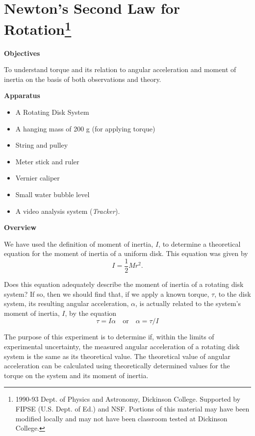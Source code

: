 
\section{Newton's Second Law for Rotation\footnote{
1990-93 Dept. of Physics and Astronomy, Dickinson College. Supported by FIPSE
(U.S. Dept. of Ed.) and NSF. Portions of this material may have been modified
locally and may not have been classroom tested at Dickinson College.
}}

\makelabheader %

\textbf{Objectives} 

To understand torque and its relation to angular acceleration and moment of
inertia on the basis of both observations and theory. 

\textbf{Apparatus}

\begin{itemize}
\item A Rotating Disk System 
\item A hanging mass of 200 g (for applying torque) 
\item String and pulley
\item Meter stick and ruler
\item Vernier caliper
\item Small water bubble level
\item A video analysis system (\textit{Tracker}).
\end{itemize}
\textbf{Overview} 

We have used the definition of moment of inertia, $I$, to determine a theoretical equation for the moment of inertia of a uniform disk. This equation was given by
\[
I=\frac{1}{2}Mr^{2}.\]


Does this equation adequately describe the moment of inertia of a rotating
disk system? If so, then we should find that, if we apply a known torque, \( \tau  \), to the disk system, its resulting angular acceleration, \( \alpha  \), is actually related to the system's moment of inertia, $I$, by the equation
\[
\tau =I\alpha \quad \mbox{or}\quad \alpha =\tau /I\]


The purpose of this experiment is to determine if, within the limits of experimental
uncertainty, the measured angular acceleration of a rotating disk system is
the same as its theoretical value. The theoretical value of angular acceleration can be calculated using theoretically determined values for the torque on the
system and its moment of inertia.

